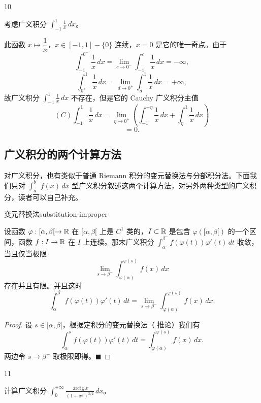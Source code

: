 \begin{sourceexample}{10}

考虑广义积分 $\displaystyle\int_{-1}^{1}\frac{1}{x}\,dx$。

\end{sourceexample}

此函数 $x\longmapsto\dfrac{1}{x}$，$x\in[-1,1]-\{0\}$ 连续，$x=0$ 是它的唯一奇点。由于
\[\int_{-1}^{0^-}\frac{1}{x}\,dx=\lim_{c\to0^-}\int_{-1}^{c}\frac{1}{x}\,dx=-\infty,\]
\[\int_{0^+}^{1}\frac{1}{x}\,dx=\lim_{d\to0^+}\int_{d}^{1}\frac{1}{x}\,dx=+\infty,\]
故广义积分 $\displaystyle\int_{-1}^{1}\frac{1}{x}\,dx$ 不存在，但是它的 Cauchy 广义积分主值
\[(C)\int_{-1}^{1}\frac{1}{x}\,dx=\lim_{\eta\to0^+}\left(\int_{-1}^{-\eta}\frac{1}{x}\,dx+\int_{\eta}^{1}\frac{1}{x}\,dx\right)\]
\[=0.\]

\subsection{广义积分的两个计算方法}
	\label{sec:9-1-4}

对广义积分，也有类似于普通 Riemann 积分的变元替换法与分部积分法。下面我们只对 $\displaystyle\int_{a}^{b^-}f(x)\,dx$ 型广义积分叙述这两个计算方法，对另外两种类型的广义积分，读者可以自己补充。

\begin{mythm}{变元替换法}{substitution-improper}

设函数 $\varphi:[\alpha,\beta[\to\mathbb{R}$ 在 $[\alpha,\beta[$ 上是 $C^1$ 类的，$I\subset\mathbb{R}$ 是包含 $\varphi([\alpha,\beta[)$ 的一个区间，函数 $f:I\to\mathbb{R}$ 在 $I$ 上连续。那末广义积分 $\displaystyle\int_{\alpha}^{\beta^-}f(\varphi(t))\varphi'(t)\,dt$ 收敛，当且仅当极限
\[\lim_{s\to\beta^-}\int_{\varphi(\alpha)}^{\varphi(s)}f(x)\,dx\]
存在并且有限。并且这时
\[\int_{\alpha}^{\beta^-}f(\varphi(t))\varphi'(t)\,dt=\lim_{s\to\beta^-}\int_{\varphi(\alpha)}^{\varphi(s)}f(x)\,dx.\]

\end{mythm}

\begin{proof}

设 $s\in[\alpha,\beta[$，根据定积分的变元替换法（ 推论）我们有
\[\int_{\alpha}^{s}f(\varphi(t))\varphi'(t)\,dt=\int_{\varphi(\alpha)}^{\varphi(s)}f(x)\,dx.\]
两边令 $s\to\beta^-$ 取极限即得。$\blacksquare$

\end{proof}

\begin{sourceexample}{11}

计算广义积分 $\displaystyle\int_0^{+\infty}\frac{\operatorname{arctg}x}{(1+x^2)^{3/2}}\,dx$。

\end{sourceexample}

